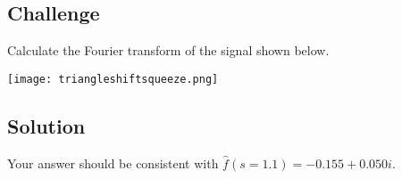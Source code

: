 \subsection*{Challenge}
Calculate the Fourier transform of the signal shown below.

\texttt{[image: triangleshiftsqueeze.png]}

\subsection*{Solution}
Your answer should be consistent with $\hat{f}(s=1.1) = -0.155 + 0.050 i$.





\fi



